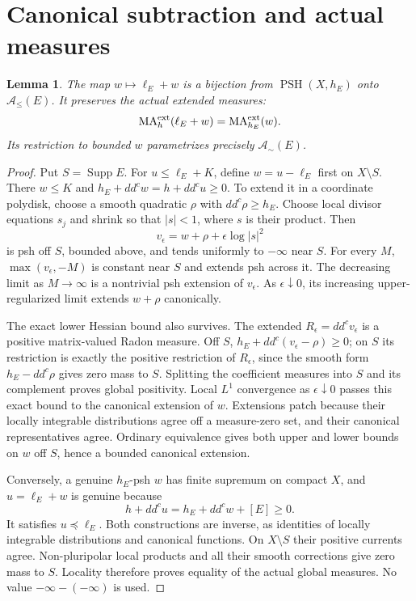 \documentclass[11pt]{article}
\newcommand{\ddc}{dd^c}
\newcommand{\MA}{\operatorname{MA}}
\newcommand{\PSH}{\operatorname{PSH}}
\newtheorem{lemma}[theorem]{Lemma}
\theoremstyle{remark}\newtheorem{remark}[theorem]{Remark}
\begin{document}
\section{Canonical subtraction and actual measures}
\begin{lemma}\label{lem:subtract}
The map $w\mapsto\ell_E+w$ is a bijection from $\PSH(X,h_E)$ onto
$\mathcal A_{\leq}(E)$. It preserves the actual extended measures:
\[
 \MA_h^{\rm ext}(\ell_E+w)=\MA_{h_E}^{\rm ext}(w).
\]
Its restriction to bounded $w$ parametrizes precisely
$\mathcal A_{\sim}(E)$.
\end{lemma}
\begin{proof}
Put $S=\operatorname{Supp}E$. For $u\leq\ell_E+K$, define
$w=u-\ell_E$ first on $X\setminus S$. There $w\leq K$ and
$h_E+\ddc w=h+\ddc u\geq0$.
To extend it in a coordinate polydisk, choose a smooth quadratic $\rho$
with $\ddc\rho\geq h_E$. Choose local divisor equations $s_j$ and shrink
so that $|s|<1$, where $s$ is their product. Then
\[
 v_\epsilon=w+\rho+\epsilon\log|s|^2
\]
is psh off $S$, bounded above, and tends uniformly to $-\infty$ near
$S$. For every $M$, $\max(v_\epsilon,-M)$ is constant near $S$ and
extends psh across it. The decreasing limit as $M\to\infty$ is a
nontrivial psh extension of $v_\epsilon$. As $\epsilon\downarrow0$,
its increasing upper-regularized limit extends $w+\rho$ canonically.

The exact lower Hessian bound also survives. The extended
$R_\epsilon=\ddc v_\epsilon$ is a positive matrix-valued Radon measure.
Off $S$, $h_E+\ddc(v_\epsilon-\rho)\geq0$; on $S$ its restriction is
exactly the positive restriction of $R_\epsilon$, since the smooth
form $h_E-\ddc\rho$ gives zero mass to $S$. Splitting the coefficient
measures into $S$ and its complement proves global positivity.
Local $L^1$ convergence as $\epsilon\downarrow0$ passes this exact
bound to the canonical extension of $w$. Extensions patch because
their locally integrable distributions agree off a measure-zero set,
and their canonical representatives agree. Ordinary equivalence
gives both upper and lower bounds on $w$ off $S$, hence a bounded
canonical extension.

Conversely, a genuine $h_E$-psh $w$ has finite supremum on compact $X$,
and $u=\ell_E+w$ is genuine because
\[
 h+\ddc u=h_E+\ddc w+[E]\geq0.
\]
It satisfies $u\preceq\ell_E$. Both constructions are inverse, as
identities of locally integrable distributions and canonical functions.
On $X\setminus S$ their positive currents agree. Non-pluripolar local
products and all their smooth corrections give zero mass to $S$.
Locality therefore proves equality of the actual global measures.
No value $-\infty-(-\infty)$ is used.
\end{proof}
\end{document}
